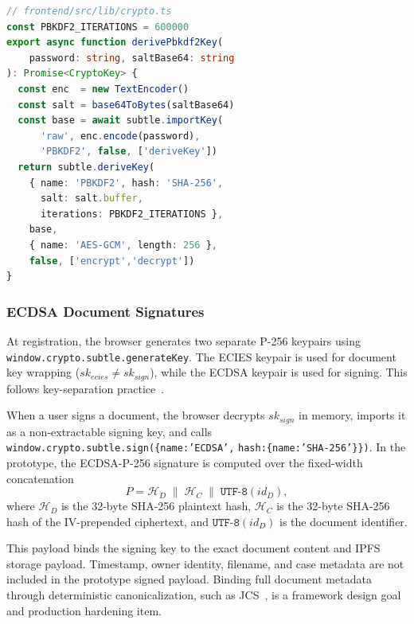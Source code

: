 \documentclass{ieeeaccess}
\begin{document}
\begin{lstlisting}[language=TypeScript,
    float=!t,
    caption={PBKDF2-SHA256 key derivation at 600,000 iterations (OWASP
    password-storage guidance; exceeds the NIST SP~800-132 minimum work
    factor). Derives the AES-256-GCM wrapping key protecting both ECIES
    and ECDSA private keys in \texttt{localStorage}.},
    label=lst:pbkdf2]
// frontend/src/lib/crypto.ts
const PBKDF2_ITERATIONS = 600000
export async function derivePbkdf2Key(
    password: string, saltBase64: string
): Promise<CryptoKey> {
  const enc  = new TextEncoder()
  const salt = base64ToBytes(saltBase64)
  const base = await subtle.importKey(
      'raw', enc.encode(password),
      'PBKDF2', false, ['deriveKey'])
  return subtle.deriveKey(
    { name: 'PBKDF2', hash: 'SHA-256',
      salt: salt.buffer,
      iterations: PBKDF2_ITERATIONS },
    base,
    { name: 'AES-GCM', length: 256 },
    false, ['encrypt','decrypt'])
}
\end{lstlisting}

\subsubsection{ECDSA Document Signatures}
\label{sec:ecdsa}
At registration, the browser generates two separate P-256 keypairs using
\texttt{window.crypto.subtle.generateKey}. The ECIES keypair is used for
document key wrapping ($sk_{ecies} \neq sk_{sign}$), while the ECDSA
keypair is used for signing. This follows key-separation
practice~\cite{nist800131a}.

When a user signs a document, the browser decrypts $sk_{sign}$ in memory,
imports it as a non-extractable signing key, and calls
\texttt{window.crypto.subtle.sign(}\allowbreak\texttt{\{name:'ECDSA',}\allowbreak
\texttt{hash:\{name:'SHA-256'\}\})}. In the prototype, the \mbox{ECDSA-P-256}
signature is computed over the fixed-width concatenation
\begin{equation}
P = \mathcal{H}_D \;\|\; \mathcal{H}_C \;\|\;
    \texttt{UTF-8}(id_D),
\label{eq:sigpayload}
\end{equation}
where $\mathcal{H}_D$ is the 32-byte SHA-256 plaintext hash,
$\mathcal{H}_C$ is the 32-byte SHA-256 hash of the IV-prepended
ciphertext, and $\texttt{UTF-8}(id_D)$ is the document identifier.

This payload binds the signing key to the exact document content and IPFS
storage payload. Timestamp, owner identity, filename, and case metadata
are not included in the prototype signed payload. Binding full document
metadata through deterministic canonicalization, such as JCS~\cite{rfc8785jcs},
is a framework design goal and production hardening item.
\end{document}
